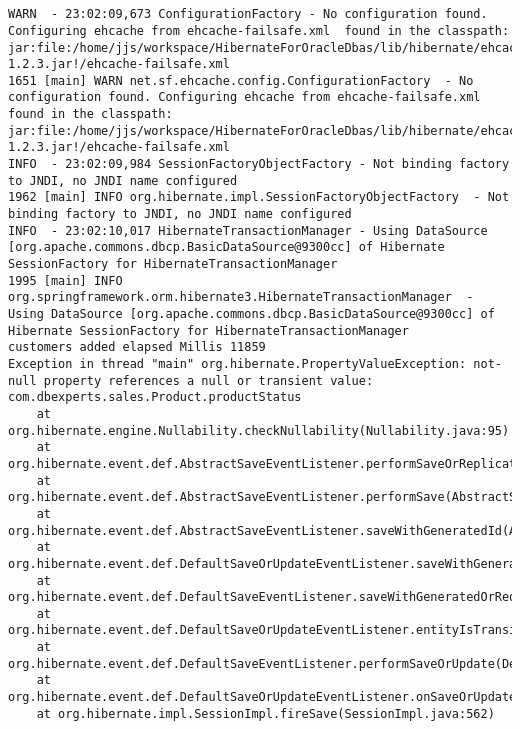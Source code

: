 \section{}
\begin{verbatim}
WARN  - 23:02:09,673 ConfigurationFactory - No configuration found. Configuring ehcache from ehcache-failsafe.xml  found in the classpath: jar:file:/home/jjs/workspace/HibernateForOracleDbas/lib/hibernate/ehcache-1.2.3.jar!/ehcache-failsafe.xml
1651 [main] WARN net.sf.ehcache.config.ConfigurationFactory  - No configuration found. Configuring ehcache from ehcache-failsafe.xml  found in the classpath: jar:file:/home/jjs/workspace/HibernateForOracleDbas/lib/hibernate/ehcache-1.2.3.jar!/ehcache-failsafe.xml
INFO  - 23:02:09,984 SessionFactoryObjectFactory - Not binding factory to JNDI, no JNDI name configured
1962 [main] INFO org.hibernate.impl.SessionFactoryObjectFactory  - Not binding factory to JNDI, no JNDI name configured
INFO  - 23:02:10,017 HibernateTransactionManager - Using DataSource [org.apache.commons.dbcp.BasicDataSource@9300cc] of Hibernate SessionFactory for HibernateTransactionManager
1995 [main] INFO org.springframework.orm.hibernate3.HibernateTransactionManager  - Using DataSource [org.apache.commons.dbcp.BasicDataSource@9300cc] of Hibernate SessionFactory for HibernateTransactionManager
customers added elapsed Millis 11859
Exception in thread "main" org.hibernate.PropertyValueException: not-null property references a null or transient value: com.dbexperts.sales.Product.productStatus
	at org.hibernate.engine.Nullability.checkNullability(Nullability.java:95)
	at org.hibernate.event.def.AbstractSaveEventListener.performSaveOrReplicate(AbstractSaveEventListener.java:313)
	at org.hibernate.event.def.AbstractSaveEventListener.performSave(AbstractSaveEventListener.java:204)
	at org.hibernate.event.def.AbstractSaveEventListener.saveWithGeneratedId(AbstractSaveEventListener.java:144)
	at org.hibernate.event.def.DefaultSaveOrUpdateEventListener.saveWithGeneratedOrRequestedId(DefaultSaveOrUpdateEventListener.java:210)
	at org.hibernate.event.def.DefaultSaveEventListener.saveWithGeneratedOrRequestedId(DefaultSaveEventListener.java:56)
	at org.hibernate.event.def.DefaultSaveOrUpdateEventListener.entityIsTransient(DefaultSaveOrUpdateEventListener.java:195)
	at org.hibernate.event.def.DefaultSaveEventListener.performSaveOrUpdate(DefaultSaveEventListener.java:50)
	at org.hibernate.event.def.DefaultSaveOrUpdateEventListener.onSaveOrUpdate(DefaultSaveOrUpdateEventListener.java:93)
	at org.hibernate.impl.SessionImpl.fireSave(SessionImpl.java:562)

\end{verbatim}
